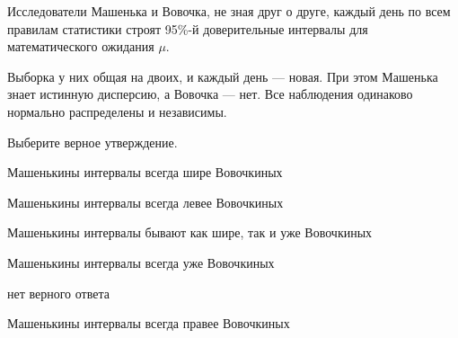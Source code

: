 
\begin{question}
Исследователи Машенька и Вовочка, не зная друг о друге, каждый день по
всем правилам статистики строят 95\%-й доверительные интервалы для
математического ожидания \(\mu\).

Выборка у них общая на двоих, и каждый день --- новая. При этом Машенька
знает истинную дисперсию, а Вовочка --- нет. Все наблюдения одинаково
нормально распределены и независимы.

Выберите верное утверждение.
\begin{answerlist}
  \item Машенькины интервалы всегда шире Вовочкиных
  \item Машенькины интервалы всегда левее Вовочкиных
  \item Машенькины интервалы бывают как шире, так и уже Вовочкиных
  \item Машенькины интервалы всегда уже Вовочкиных
  \item нет верного ответа
  \item Машенькины интервалы всегда правее Вовочкиных
\end{answerlist}
\end{question}


